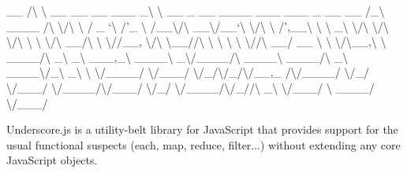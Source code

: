 \+\_\+\+\_\+ /\textbackslash{} \textbackslash{} \+\_\+\+\_\+ \+\_\+\+\_\+ \+\_\+\+\_\+ \+\_\+\+\_\+\+\_\+ \+\_\+\textbackslash{} \textbackslash{} \+\_\+\+\_\+ \+\_\+ \+\_\+\+\_\+ \+\_\+\+\_\+\+\_\+\+\_\+ \+\_\+\+\_\+\+\_\+ \+\_\+\+\_\+\+\_\+ \+\_\+ \+\_\+\+\_\+ \+\_\+\+\_\+ /\+\_\+\textbackslash{} \+\_\+\+\_\+\+\_\+\+\_\+ /\textbackslash{} \textbackslash{}/\textbackslash{} \textbackslash{} /\textquotesingle{} \+\_\+ `\textbackslash{} /'\+\_\+ \textbackslash{} /\textquotesingle{}\+\_\+\+\_\+{\ttfamily \textbackslash{}/\textbackslash{} \+\_\+\+\_\+\textbackslash{}/ ,\+\_\+\+\_\+\textbackslash{} / \+\_\+\+\_\+\+\_\+\textbackslash{} / \+\_\+\+\_\+}\textbackslash{}/\textbackslash{} \+\_\+\+\_\+\textbackslash{}/\textquotesingle{}\+\_\+\+\_\+`\textbackslash{} \textbackslash{}/\textbackslash{} \textbackslash{} /',\+\_\+\+\_\+\textbackslash{} \textbackslash{} \textbackslash{} \+\_\+\textbackslash{} \textbackslash{}/\textbackslash{} \textbackslash{}/\textbackslash{} \textbackslash{}/\textbackslash{} \textbackslash{} \textbackslash{} \textbackslash{}/\textbackslash{} \+\_\+\+\_\+/\textbackslash{} \textbackslash{} \textbackslash{}//\+\_\+\+\_\+, {\ttfamily \textbackslash{}/\textbackslash{} \textbackslash{}\+\_\+\+\_\+//\textbackslash{} \textbackslash{} \textbackslash{} \textbackslash{} \textbackslash{} \textbackslash{}//\textbackslash{} \+\_\+\+\_\+/ \+\_\+\+\_\+ \textbackslash{} \textbackslash{} \textbackslash{}/\textbackslash{}\+\_\+\+\_\+,}\textbackslash{} \textbackslash{} \+\_\+\+\_\+\+\_\+\+\_\+/\textbackslash{} \+\_\+\textbackslash{} \+\_\+\textbackslash{} \+\_\+\+\_\+\+\_\+,\+\_\+\textbackslash{} \+\_\+\+\_\+\+\_\+\+\_\+\textbackslash{} \+\_\+\textbackslash{}/\+\_\+\+\_\+\+\_\+\+\_\+/\textbackslash{} \+\_\+\+\_\+\+\_\+\+\_\+\textbackslash{} \+\_\+\+\_\+\+\_\+\+\_\+/\textbackslash{} \+\_\+\textbackslash{} \+\_\+\+\_\+\+\_\+\+\_\+\textbackslash{}/\+\_\+\textbackslash{} \+\_\+\textbackslash{} \textbackslash{} \textbackslash{}/\+\_\+\+\_\+\+\_\+\+\_\+/ \textbackslash{}/\+\_\+\+\_\+\+\_\+/ \textbackslash{}/\+\_\+/\textbackslash{}/\+\_\+/\textbackslash{}/\+\_\+\+\_\+,\+\_\+ /\textbackslash{}/\+\_\+\+\_\+\+\_\+\+\_\+/ \textbackslash{}/\+\_\+/ \textbackslash{}/\+\_\+\+\_\+\+\_\+/ \textbackslash{}/\+\_\+\+\_\+\+\_\+\+\_\+/\textbackslash{}/\+\_\+\+\_\+\+\_\+/ \textbackslash{}/\+\_\+/ \textbackslash{}/\+\_\+\+\_\+\+\_\+\+\_\+/\textbackslash{}/\+\_\+//\textbackslash{} \+\_\+\textbackslash{} \textbackslash{}/\+\_\+\+\_\+\+\_\+/ \textbackslash{} \+\_\+\+\_\+\+\_\+\+\_\+/ \textbackslash{}/\+\_\+\+\_\+\+\_\+/

Underscore.\+js is a utility-\/belt library for Java\+Script that provides support for the usual functional suspects (each, map, reduce, filter...) without extending any core Java\+Script objects.

